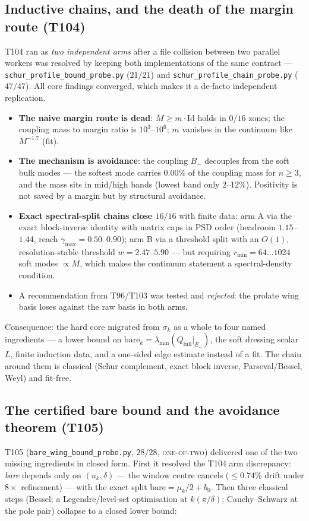 \documentclass[11pt,a4paper]{article}
\newcommand{\Qfull}{Q_{\mathrm{full}}}
\begin{document}
\subsection{Inductive chains, and the death of the margin route (T104)}
T104 ran as \emph{two independent arms} after a file collision between two parallel workers was resolved
by keeping both implementations of the same contract --- \texttt{schur\_profile\_bound\_probe.py}
($21/21$) and \texttt{schur\_profile\_chain\_probe.py} ($47/47$). All core findings converged, which
makes it a de-facto independent replication.

\begin{itemize}[leftmargin=1.5em]
\item \textbf{The naive margin route is dead}: $M\ge m\cdot\mathrm{Id}$ holds in $0/16$ zones; the
coupling mass to margin ratio is $10^3$--$10^6$; $m$ vanishes in the continuum like $M^{-1.7}$ (fit).
\item \textbf{The mechanism is avoidance}: the coupling $B_-$ decouples from the soft bulk modes ---
the softest mode carries $0.00\%$ of the coupling mass for $n\ge3$, and the mass sits in mid/high
bands (lowest band only $2$--$12\%$). Positivity is not saved by a margin but by structural avoidance.
\item \textbf{Exact spectral-split chains close $16/16$} with finite data: arm A via the exact
block-inverse identity with matrix caps in PSD order (headroom $1.15$--$1.44$, reach
$\gamma_{\max}=0.50$--$0.90$); arm B via a threshold split with an $O(1)$, resolution-stable threshold
$w=2.47$--$5.90$ --- but requiring $r_{\min}=64\ldots1024$ soft modes $\propto M$, which makes the
continuum statement a spectral-density condition.
\item A recommendation from T96/T103 was tested and \emph{rejected}: the prolate wing basis loses
against the raw basis in both arms.
\end{itemize}

\noindent Consequence: the hard core migrated from $\sigma_k$ as a whole to four named ingredients ---
a lower bound on $\mathrm{bare}_k=\lambda_{\min}(\Qfull|_{E_-})$, the soft dressing scalar $L$, finite
induction data, and a one-sided edge estimate instead of a fit. The chain around them is classical
(Schur complement, exact block inverse, Parseval/Bessel, Weyl) and fit-free.

\subsection{The certified bare bound and the avoidance theorem (T105)}
T105 (\texttt{bare\_wing\_bound\_probe.py}, $28/28$, \textsc{one-of-two}) delivered one of the two
missing ingredients in closed form. First it resolved the T104 arm discrepancy: \emph{bare} depends only
on $(u_k,\delta)$ --- the window centre cancels ($\le0.74\%$ drift under $8\times$ refinement) --- with
the exact split $\mathrm{bare}=\mu_k/2+b_0$. Then three classical steps (Bessel; a Legendre/level-set
optimisation at $k(\pi/\delta)$; Cauchy--Schwarz at the pole pair) collapse to a closed lower bound:
\end{document}
